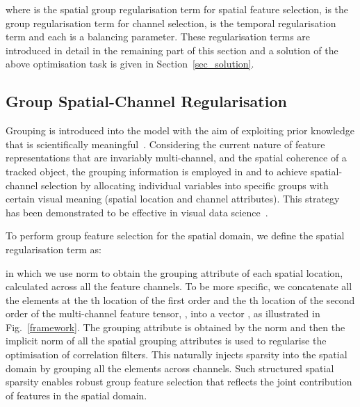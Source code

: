 \documentclass[10pt,twocolumn,letterpaper]{article}
\begin{document}
where  is the spatial group regularisation term for spatial feature selection,  is the group regularisation term for channel selection,  is the temporal regularisation term and each  is a balancing parameter.
These regularisation terms are introduced in detail in the remaining part of this section and a solution of the above optimisation task is given in Section~\ref{sec_solution}.

\subsection{Group Spatial-Channel Regularisation}
Grouping is introduced into the model with the aim  of exploiting prior knowledge that is scientifically meaningful~\cite{huang2012selective}.
Considering the current nature of feature representations that are invariably multi-channel, and the spatial coherence of a tracked object, the grouping information is employed in  and  to achieve spatial-channel selection by allocating individual variables into specific groups with certain visual meaning (spatial location and channel attributes). This strategy has been demonstrated to be effective in visual data science~\cite{nie2010efficient,bach2012structured,yuan2006model,hu2017group,gui2017feature,wang2017deep,wang2018semi}.

To perform group feature selection for the spatial domain, we define the spatial regularisation term as:

in which we use  norm to obtain the grouping attribute of each spatial location, calculated across all the feature channels.
To be more specific, we concatenate all the elements at the th location of the first order and the th location of the second order of the multi-channel feature tensor, , into a vector , as illustrated in Fig.~\ref{framework}. 
The grouping attribute is obtained by the  norm and then the implicit  norm of all the spatial grouping attributes is used to regularise the optimisation of correlation filters.
This naturally injects sparsity into the spatial domain by grouping all the elements across channels.
Such structured spatial sparsity enables robust group feature selection that reflects the joint contribution of features in the spatial domain.
\end{document}
